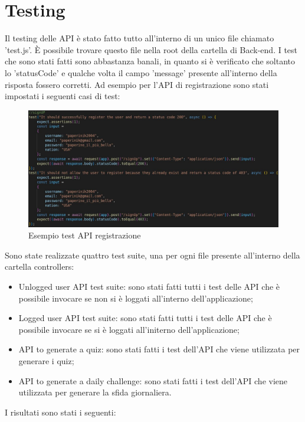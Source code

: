 \section{Testing}
Il testing delle API è stato fatto tutto all'interno di un unico file chiamato 'test.js'. È possibile trovare questo file nella root della cartella di Back-end. I test che sono stati fatti sono abbastanza banali, in quanto si è verificato che soltanto lo 'statusCode' e qualche volta il campo 'message' presente all'interno della risposta fossero corretti. Ad esempio per l'API di registrazione sono stati impostati i seguenti casi di test:

\begin{figure}[!h]
\centering
\includegraphics[scale=0.4]{images/esempio_di_test.jpg}
\caption{Esempio test API registrazione}
\label{fig:test_api}
\end{figure}
\noindent
Sono state realizzate quattro test suite, una per ogni file presente all'interno della cartella controllers:
\begin{itemize}
    \item Unlogged user API test suite: sono stati fatti tutti i test delle API che è possibile invocare se non si è loggati all'interno dell'applicazione;
    \item Logged user API test suite: sono stati fatti tutti i test delle API che è possibile invocare se si è loggati all'initerno dell'applicazione;
    \item API to generate a quiz: sono stati fatti i test dell'API che viene utilizzata per generare i quiz;
    \item API to generate a daily challenge: sono stati fatti i test dell'API che viene utilizzata per generare la sfida giornaliera.
\end{itemize}
I risultati sono stati i seguenti:

